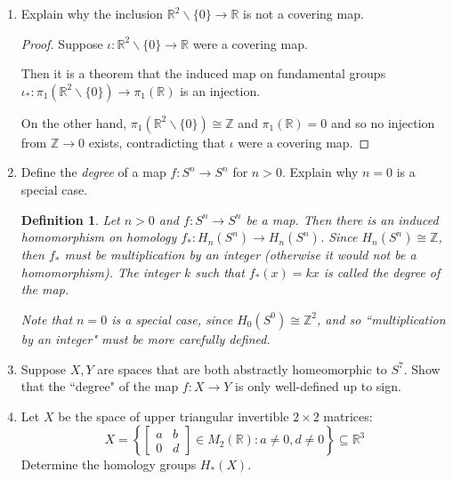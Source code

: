 \documentclass{article}
\newtheorem*{definition}{Definition}
\begin{document}
\begin{enumerate}
	\item Explain why the inclusion $\mathbb{R}^2 \backslash \{0\} \rightarrow \mathbb{R}$ is not a covering map.
	
	\begin{proof}
		Suppose $\iota : \mathbb{R}^2 \backslash \{ 0 \} \rightarrow \mathbb{R}$ were a covering map. 
		
		Then it is a theorem that the induced map on fundamental groups $\iota_*: \pi_1(\mathbb{R}^2 \backslash \{ 0 \}) \rightarrow \pi_1(\mathbb{R})$ is an injection. 
		
		On the other hand, $\pi_1 (\mathbb{R}^2 \backslash \{ 0 \}) \cong \mathbb{Z}$ and $\pi_1( \mathbb{R} ) = 0$ and so no injection from $\mathbb{Z} \rightarrow 0$ exists, contradicting that $\iota$ were a covering map.
	\end{proof} 
	
	\item Define the \textit{degree} of a map $f: S^n \rightarrow S^n$ for $n > 0$. Explain why $n=0$ is a special case.
	
	\begin{definition}
		Let $n>0$ and $f: S^n \rightarrow S^n$ be a map. Then there is an induced homomorphism on homology $f_* : H_n (S^n) \rightarrow H_n (S^n)$. Since $H_n(S^n) \cong \mathbb{Z}$, then $f_*$ must be multiplication by an integer (otherwise it would not be a homomorphism). The integer $k$ such that $f_*(x) = kx$ is called the degree of the map.
		
		Note that $n=0$ is a special case, since $H_0(S^0) \cong \mathbb{Z}^2$, and so ``multiplication by an integer" must be more carefully defined.
	\end{definition}
	
	\item Suppose $X, Y$ are spaces that are both abstractly homeomorphic to $S^7$. Show that the ``degree" of the map $f: X \rightarrow Y$ is only well-defined up to sign.
	
	\item Let $X$ be the space of upper triangular invertible $2\times 2$ matrices:
	\[X = \left \{ \begin{bmatrix} a & b \\ 0 & d \end{bmatrix} \in M_2 (\mathbb{R}) : a \neq 0, d \neq 0\right \} \subseteq \mathbb{R}^3\]
	 Determine the homology groups $H_*(X)$. 

	

\end{enumerate}
\end{document}
